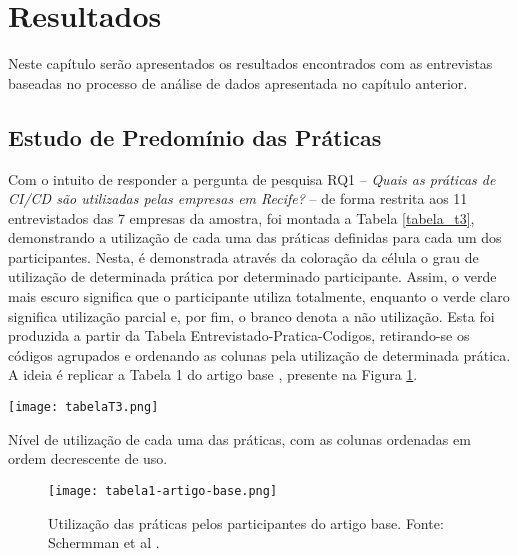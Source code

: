 \section{Resultados}

Neste capítulo serão apresentados os resultados encontrados com as entrevistas baseadas no processo de análise de dados apresentada no capítulo anterior.

\subsection{Estudo de Predomínio das Práticas}

Com o intuito de responder a pergunta de pesquisa RQ1 -- \emph{Quais as práticas de CI/CD são utilizadas pelas empresas em Recife?} -- de forma restrita aos 11 entrevistados das 7 empresas da amostra, foi montada a Tabela \ref{tabela_t3}, demonstrando a utilização de cada uma das práticas definidas para cada um dos participantes. Nesta, é demonstrada através da coloração da célula o grau de utilização de determinada prática por determinado participante. Assim, o verde mais escuro significa que o participante utiliza totalmente, enquanto o verde claro significa utilização parcial e, por fim, o branco denota a não utilização. Esta foi produzida a partir da Tabela Entrevistado-Pratica-Codigos, retirando-se os códigos agrupados e ordenando as colunas pela utilização de determinada prática. A ideia é replicar a Tabela 1 do artigo base \cite{empiricalStudy2016}, presente na Figura \ref{tabela_1_artigo_base}.

\begin{table}[ht]
\begin{center}
\texttt{[image: tabelaT3.png]}
\end{center}
\caption[Nível de utilização das práticas, com as colunas em ordem decrescente de uso]{
    Nível de utilização de cada uma das práticas, com as colunas ordenadas em ordem decrescente de uso.
}\label{tabela_t3}
\end{table}

\begin{figure}[ht]
\begin{center}
\texttt{[image: tabela1-artigo-base.png]}
\end{center}
\caption[Tabela 1 do artigo base]{
    Utilização das práticas pelos participantes do artigo base.
    Fonte: Schermman et al \cite{empiricalStudy2016}.
}\label{tabela_1_artigo_base}
\end{figure}

